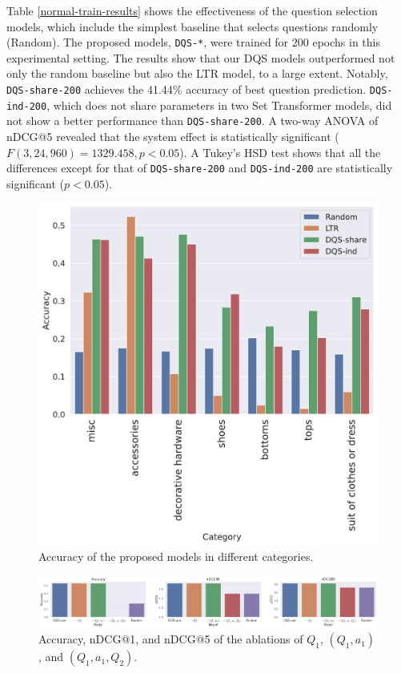 Table \ref{normal-train-results} shows the effectiveness of the question selection models, which include the simplest baseline that selects questions randomly (Random).
The proposed models, \texttt{DQS-*}, were trained for 200 epochs in this experimental setting. 
The results show that our DQS models outperformed not only 
the random baseline but also the LTR model, to a large extent. 
Notably, \texttt{DQS-share-200} achieves the 41.44\% accuracy of best question prediction. \texttt{DQS-ind-200}, which does not share parameters in two Set Transformer models, did not show a better performance than \texttt{DQS-share-200}. A two-way ANOVA of nDCG@5 revealed that the system effect is statistically significant ($F(3, 24,960) = 1329.458, p < 0.05$). 
A Tukey's HSD test shows that all the differences except for
that of \texttt{DQS-share-200} and \texttt{DQS-ind-200} are statistically significant ($p < 0.05$). 

\begin{figure}
  \centering
  \includegraphics[width=0.6\linewidth]{figures/category_acc.pdf}
  \caption{Accuracy of the proposed models in different categories.}
  \label{category-acc}
\end{figure}

\begin{figure}
  \centering
  \includegraphics[width=\linewidth]{figures/ablation.pdf}
  \caption{Accuracy, nDCG@1, and nDCG@5 of the ablations of $Q_1$, $(Q_1, a_1)$, and $(Q_1, a_1, Q_2)$.}
  \label{ablation}
\end{figure}

